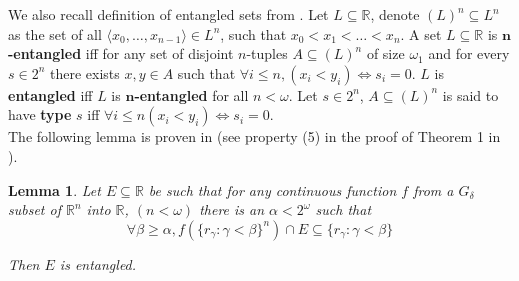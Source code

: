 \documentclass[11pt]{amsart}
\newtheorem{lemma}[theorem]{Lemma}
\theoremstyle{definition}
\theoremstyle{remark}
\newcommand{\R}{\mathbb{R}}
\theoremstyle{plain}
\begin{document}
 We also recall definition of entangled sets from \cite{Todorcevic1985}. Let $L\subseteq \R$, denote $(L)^n\subseteq L^n$ as the set of all $\langle x_0,\dots, x_{n-1}\rangle\in L^n$, such that $x_0<x_1<\dots<x_n$. A set $L\subseteq \R$ is $\mathbf{n}$\textbf{-entangled} iff for any set of disjoint $n$-tuples $A\subseteq (L)^n$ of size $\omega_1$ and for every $s\in 2^n$ there exists $x,y\in A$ such that $\forall i\leq n, (x_i<y_i)\iff s_i=0$. $L$ is \textbf{entangled} iff $L$ is $\mathbf{n}$\textbf{-entangled} for all $n<\omega$. Let $s\in 2^n$, $A\subseteq (L)^n$ is said to have \textbf{type} $s$ iff  $\forall i\leq n(x_i<y_i)\iff s_i=0$.\\

The following lemma is proven in \cite{Todorcevic1985} (see property (5) in the proof of  Theorem 1 in \cite{Todorcevic1985}).

\begin{lemma}\cite{Todorcevic1985}\label{lem:entangled}
    Let $E\subseteq \R$ be such that for any continuous function $f$ from a $G_\delta$ subset of ${\mathbb R}^n$ into ${\mathbb R}$, $(n<\omega)$ there is an $\alpha<2^\omega$ such that
        \[
        \forall \beta\geq \alpha, f(\{r_\gamma:\gamma<\beta\}^n) \cap E \subseteq \{r_\gamma:\gamma<\beta\}
        \]

    Then $E$ is entangled.
\end{lemma}
\end{document}
